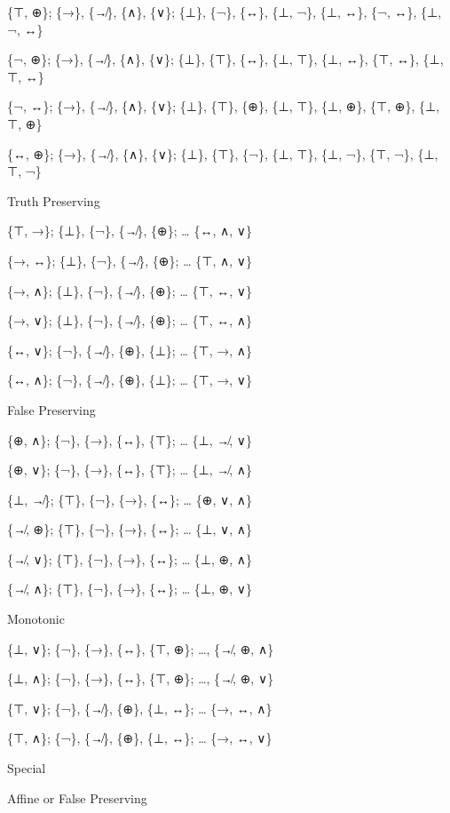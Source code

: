 \{⊤, ⊕\}; \{→\}, \{↛\}, \{∧\}, \{∨\}; \{⊥\}, \{¬\}, \{↔\}, \{⊥, ¬\},
\{⊥, ↔\}, \{¬, ↔\}, \{⊥, ¬, ↔\}

\{¬, ⊕\}; \{→\}, \{↛\}, \{∧\}, \{∨\}; \{⊥\}, \{⊤\}, \{↔\}, \{⊥, ⊤\},
\{⊥, ↔\}, \{⊤, ↔\}, \{⊥, ⊤, ↔\}

\{¬, ↔\}; \{→\}, \{↛\}, \{∧\}, \{∨\}; \{⊥\}, \{⊤\}, \{⊕\}, \{⊥, ⊤\},
\{⊥, ⊕\}, \{⊤, ⊕\}, \{⊥, ⊤, ⊕\}

\{↔, ⊕\}; \{→\}, \{↛\}, \{∧\}, \{∨\}; \{⊥\}, \{⊤\}, \{¬\}, \{⊥, ⊤\},
\{⊥, ¬\}, \{⊤, ¬\}, \{⊥, ⊤, ¬\}

\protect\hypertarget{anchor-10}{}{}Truth Preserving

\{⊤, →\}; \{⊥\}, \{¬\}, \{↛\}, \{⊕\}; \ldots{} \{↔, ∧, ∨\}

\{→, ↔\}; \{⊥\}, \{¬\}, \{↛\}, \{⊕\}; \ldots{} \{⊤, ∧, ∨\}

\{→, ∧\}; \{⊥\}, \{¬\}, \{↛\}, \{⊕\}; \ldots{} \{⊤, ↔, ∨\}

\{→, ∨\}; \{⊥\}, \{¬\}, \{↛\}, \{⊕\}; \ldots{} \{⊤, ↔, ∧\}

\{↔, ∨\}; \{¬\}, \{↛\}, \{⊕\}, \{⊥\}; \ldots{} \{⊤, →, ∧\}

\{↔, ∧\}; \{¬\}, \{↛\}, \{⊕\}, \{⊥\}; \ldots{} \{⊤, →, ∨\}

\protect\hypertarget{anchor-11}{}{}False Preserving

\{⊕, ∧\}; \{¬\}, \{→\}, \{↔\}, \{⊤\}; \ldots{} \{⊥, ↛, ∨\}

\{⊕, ∨\}; \{¬\}, \{→\}, \{↔\}, \{⊤\}; \ldots{} \{⊥, ↛, ∧\}

\{⊥, ↛\}; \{⊤\}, \{¬\}, \{→\}, \{↔\}; \ldots{} \{⊕, ∨, ∧\}

\{↛, ⊕\}; \{⊤\}, \{¬\}, \{→\}, \{↔\}; \ldots{} \{⊥, ∨, ∧\}

\{↛, ∨\}; \{⊤\}, \{¬\}, \{→\}, \{↔\}; \ldots{} \{⊥, ⊕, ∧\}

\{↛, ∧\}; \{⊤\}, \{¬\}, \{→\}, \{↔\}; \ldots{} \{⊥, ⊕, ∨\}

\protect\hypertarget{anchor-12}{}{}Monotonic

\{⊥, ∨\}; \{¬\}, \{→\}, \{↔\}, \{⊤, ⊕\}; \ldots, \{↛, ⊕, ∧\}

\{⊥, ∧\}; \{¬\}, \{→\}, \{↔\}, \{⊤, ⊕\}; \ldots, \{↛, ⊕, ∨\}

\{⊤, ∨\}; \{¬\}, \{↛\}, \{⊕\}, \{⊥, ↔\}; \ldots{} \{→, ↔, ∧\}

\{⊤, ∧\}; \{¬\}, \{↛\}, \{⊕\}, \{⊥, ↔\}; \ldots{} \{→, ↔, ∨\}

\protect\hypertarget{anchor-13}{}{}Special

Affine or False Preserving


